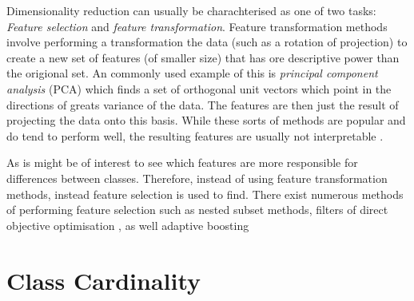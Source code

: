 Dimensionality reduction can usually be charachterised as one of two tasks: \textit{Feature selection} and \textit{feature transformation}. Feature transformation methods involve performing a transformation the data (such as a rotation of projection) to create a new set of features (of smaller size) that has ore descriptive power than the origional set. An commonly used example of this is \textit{principal component analysis} (PCA) which finds a set of orthogonal unit vectors which point in the directions of greats variance of the data. The features are then just the result of projecting the data onto this basis. While these sorts of methods are popular and do tend to perform well, the resulting features are usually not interpretable \cite{Guyon}. 

As is might be of interest to see which features are more responsible for differences between classes. Therefore, instead of using feature transformation methods, instead feature selection is used to find. There exist numerous methods of performing feature selection such as nested subset methods, filters of direct objective optimisation \cite{Guyon}, as well adaptive boosting \cite{Wang_2}





\section{Class Cardinality}